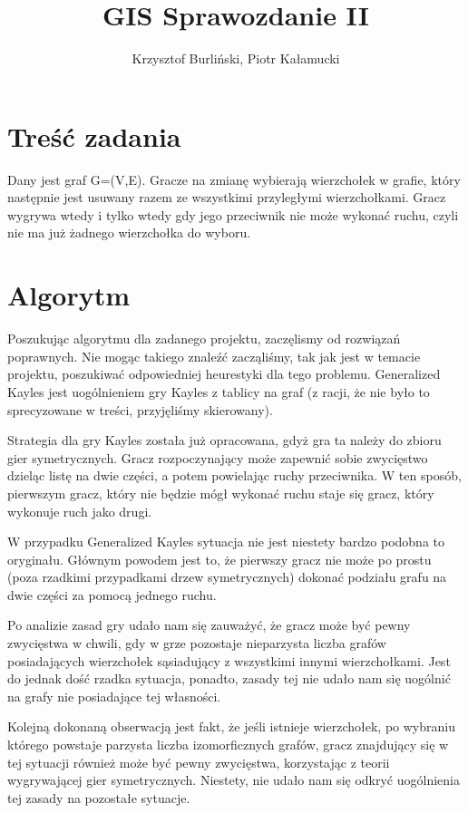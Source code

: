 \documentclass[11pt,a4paper]{article}
\title{GIS Sprawozdanie II}
\author{Krzysztof Burliński, Piotr Kałamucki}
\begin{document}
\maketitle
\tableofcontents
\newpage
\section{Treść zadania}Dany jest graf G=(V,E). Gracze na zmianę wybierają wierzchołek w grafie, który następnie jest usuwany razem ze wszystkimi przyległymi wierzchołkami. Gracz wygrywa wtedy i tylko wtedy gdy jego przeciwnik nie może wykonać ruchu, czyli nie ma już żadnego wierzchołka do wyboru.
\section{Algorytm}
Poszukując algorytmu dla zadanego projektu, zaczęlismy od rozwiązań poprawnych. Nie mogąc takiego znaleźć zacząliśmy, tak jak jest w temacie projektu, poszukiwać odpowiedniej heurestyki dla tego problemu. Generalized Kayles jest uogólnieniem gry Kayles z tablicy na graf (z racji, że nie było to sprecyzowane w treści, przyjęliśmy skierowany). 

Strategia dla gry Kayles została już opracowana, gdyż gra ta należy do zbioru gier symetrycznych. Gracz rozpoczynający może zapewnić sobie zwycięstwo dzieląc listę na dwie części, a potem powielając ruchy przeciwnika. W ten sposób, pierwszym gracz, który nie będzie mógł wykonać ruchu staje się gracz, który wykonuje ruch jako drugi.

W przypadku Generalized Kayles sytuacja nie jest niestety bardzo podobna to oryginału. Głównym powodem jest to, że pierwszy gracz nie może po prostu (poza rzadkimi przypadkami drzew symetrycznych) dokonać podziału grafu na dwie części za pomocą jednego ruchu. 

Po analizie zasad gry udało nam się zauważyć, że gracz może być pewny zwycięstwa w chwili, gdy w grze pozostaje nieparzysta liczba grafów posiadających wierzchołek sąsiadujący z wszystkimi innymi wierzchołkami. Jest do jednak dość rzadka sytuacja, ponadto, zasady tej nie udało nam się uogólnić na grafy nie posiadające tej własności.

Kolejną dokonaną obserwacją jest fakt, że jeśli istnieje wierzchołek, po wybraniu którego powstaje parzysta liczba izomorficznych grafów, gracz znajdujący się w tej sytuacji również może być pewny zwycięstwa, korzystając z teorii wygrywającej gier symetrycznych. Niestety, nie udało nam się odkryć uogólnienia tej zasady na pozostałe sytuacje. 
\end{document}

